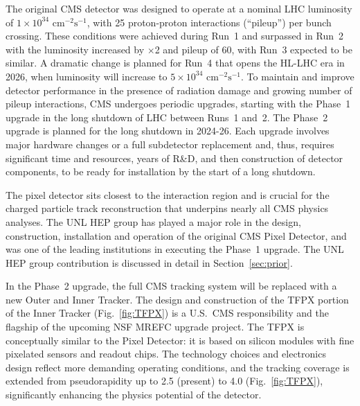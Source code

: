 The original CMS detector was designed to operate at a nominal LHC luminosity of $1\!\times\! 10^{34}\textrm{ cm}^{-2}\textrm{s}^{-1}$, with 25 proton-proton interactions (``pileup'') per bunch crossing. These conditions were achieved during Run~1 and surpassed in Run~2 with the luminosity increased by $\times$2 and pileup of 60, with Run~3 expected to be similar. A dramatic change is planned for Run~4 that opens the HL-LHC era in 2026, when luminosity will increase to $5\!\times\! 10^{34}\textrm{ cm}^{-2}\textrm{s}^{-1}$. To maintain and improve detector performance in the presence of radiation damage and growing number of pileup interactions, CMS undergoes periodic upgrades, starting with the Phase~1 upgrade in the long shutdown of LHC between Runs~1 and~2. The Phase~2 upgrade is planned for the long shutdown in 2024-26. Each upgrade involves major hardware changes or a full subdetector replacement and, thus, requires significant time and resources, years of R\&D, and then construction of detector components, to be ready for installation by the start of a long shutdown.

The pixel detector sits closest to the interaction region and is crucial for the charged particle track reconstruction that underpins nearly all CMS physics analyses. The UNL HEP group has played a major role in the design, construction, installation and operation of the original CMS Pixel Detector, and was one of the leading institutions in executing the Phase~1 upgrade. The UNL HEP group contribution is discussed in detail in Section~\ref{sec:prior}. 

In the Phase~2 upgrade, the full CMS tracking system will be replaced with a new Outer and Inner Tracker\cite{bib:Phase2TDR}. The design and construction of the TFPX portion of the Inner Tracker (Fig.~\ref{fig:TFPX}) is a U.S.~CMS responsibility and the flagship of the upcoming NSF MREFC upgrade project.  The TFPX is conceptually similar to the Pixel Detector: it is based on silicon modules with fine pixelated sensors and readout chips. The technology choices and electronics design reflect more demanding operating conditions, and the tracking coverage is extended from pseudorapidity up to 2.5 (present) to 4.0 (Fig.~\ref{fig:TFPX}), significantly enhancing the physics potential of the detector. 


